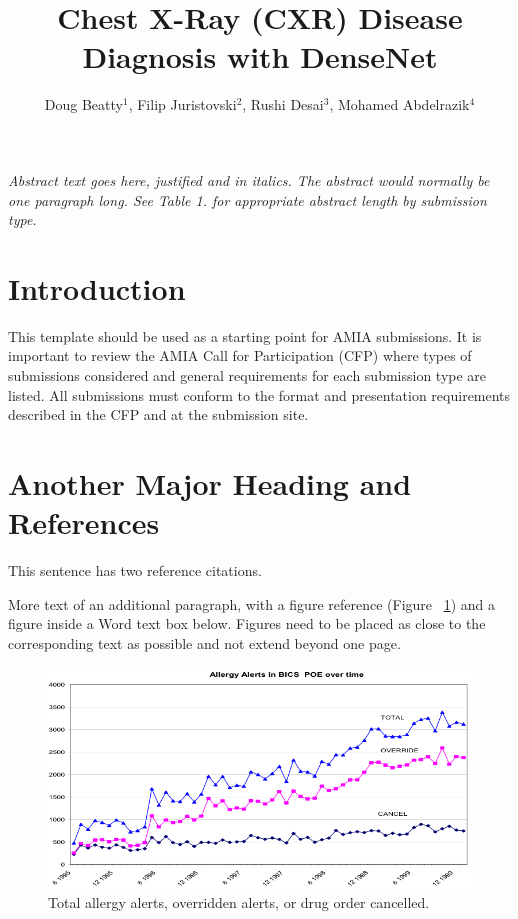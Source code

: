 \documentclass{amia}
\begin{document}
\title{Chest X-Ray (CXR) Disease Diagnosis with DenseNet}

\author{Doug Beatty$^{1}$, Filip Juristovski$^{2}$, Rushi Desai$^{3}$, Mohamed Abdelrazik$^{4}$}


\maketitle


\textit{Abstract text goes here, justified and in italics.  The abstract would normally be one paragraph long.  See Table 1. for appropriate abstract length by submission type.}

\section*{Introduction}
This template should be used as a starting point for AMIA submissions.
It is important to review the AMIA Call for Participation (CFP) where types of submissions considered and general requirements for each submission type are listed. All submissions must conform to the format and presentation requirements described in the CFP and at the submission site.


\section*{Another Major Heading and References}
This sentence has two reference citations\cite{ref1,ref2}.

More text of an additional paragraph, with a figure reference (Figure ~\ref{fig1}) and a figure inside a Word text box below.  Figures need to be placed as close to the corresponding text as possible and not extend beyond one page.\\
\begin{figure}[h!]
\centering
\includegraphics[scale=1]{pics/figure1.png}
\caption{Total allergy alerts, overridden alerts, or drug order cancelled.}
\label{fig1}
\end{figure}
\end{document}
